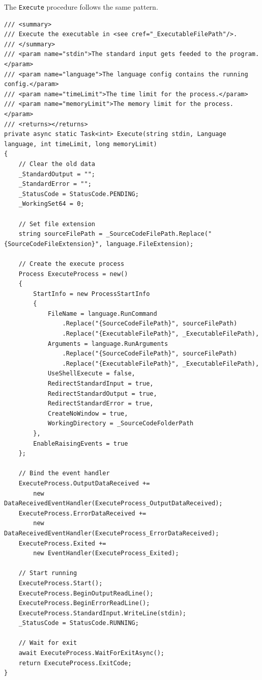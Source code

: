 \documentclass[a4paper]{report}
\newcommand{\code}{\texttt}
\begin{document}
The \code{Execute} procedure follows the same pattern.

\begin{verbatim}
/// <summary>
/// Execute the executable in <see cref="_ExecutableFilePath"/>.
/// </summary>
/// <param name="stdin">The standard input gets feeded to the program.</param>
/// <param name="language">The language config contains the running config.</param>
/// <param name="timeLimit">The time limit for the process.</param>
/// <param name="memoryLimit">The memory limit for the process.</param>
/// <returns></returns>
private async static Task<int> Execute(string stdin, Language language, int timeLimit, long memoryLimit)
{
    // Clear the old data
    _StandardOutput = "";
    _StandardError = "";
    _StatusCode = StatusCode.PENDING;
    _WorkingSet64 = 0;

    // Set file extension
    string sourceFilePath = _SourceCodeFilePath.Replace("{SourceCodeFileExtension}", language.FileExtension);

    // Create the execute process
    Process ExecuteProcess = new()
    {
        StartInfo = new ProcessStartInfo
        {
            FileName = language.RunCommand
                .Replace("{SourceCodeFilePath}", sourceFilePath)
                .Replace("{ExecutableFilePath}", _ExecutableFilePath),
            Arguments = language.RunArguments
                .Replace("{SourceCodeFilePath}", sourceFilePath)
                .Replace("{ExecutableFilePath}", _ExecutableFilePath),
            UseShellExecute = false,
            RedirectStandardInput = true,
            RedirectStandardOutput = true,
            RedirectStandardError = true,
            CreateNoWindow = true,
            WorkingDirectory = _SourceCodeFolderPath
        },
        EnableRaisingEvents = true
    };

    // Bind the event handler
    ExecuteProcess.OutputDataReceived +=
        new DataReceivedEventHandler(ExecuteProcess_OutputDataReceived);
    ExecuteProcess.ErrorDataReceived +=
        new DataReceivedEventHandler(ExecuteProcess_ErrorDataReceived);
    ExecuteProcess.Exited +=
        new EventHandler(ExecuteProcess_Exited);

    // Start running
    ExecuteProcess.Start();
    ExecuteProcess.BeginOutputReadLine();
    ExecuteProcess.BeginErrorReadLine();
    ExecuteProcess.StandardInput.WriteLine(stdin);
    _StatusCode = StatusCode.RUNNING;

    // Wait for exit
    await ExecuteProcess.WaitForExitAsync();
    return ExecuteProcess.ExitCode;
}
\end{verbatim}
\end{document}
